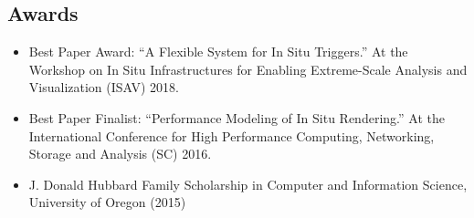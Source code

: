\documentclass[margin,line]{res}
\begin{document}
\begin{resume}
\section{\sc Awards}
\begin{itemize}
	\item Best Paper Award: “A Flexible System for In Situ Triggers.” At the Workshop on In Situ
	Infrastructures for Enabling Extreme-Scale Analysis and Visualization (ISAV) 2018.
	\item Best Paper Finalist: “Performance Modeling of In Situ Rendering.” At the International Conference
	for High Performance Computing, Networking, Storage and Analysis (SC) 2016.
	\item J. Donald Hubbard Family Scholarship in Computer and Information Science, University of Oregon (2015)
\end{itemize}



\end{resume}
\end{document}
